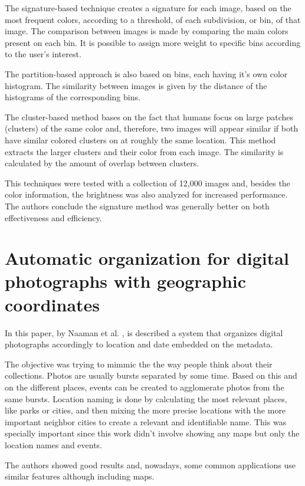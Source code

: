 The signature-based technique creates a signature for each image, based on the most frequent colors, according to a threshold, of each subdivision, or bin, of that image. The comparison between images is made by comparing the main colors present on each bin. It is possible to assign more weight to specific bins according to the user's interest.

The partition-based approach is also based on bins, each having it's own color histogram. The similarity between images is given by the distance of the histograms of the corresponding bins.

The cluster-based method bases on the fact that humans focus on large patches (clusters) of the same color and, therefore, two images will appear similar if both have similar colored clusters on at roughly the same location. This method extracts the larger clusters and their color from each image. The similarity is calculated by the amount of overlap between clusters.

This techniques were tested with a collection of 12,000 images and, besides the color information, the brightness was also analyzed for increased performance. The authors conclude the signature method was generally better on both effectiveness and efficiency.


\section{Automatic organization for digital photographs with geographic coordinates} %
\label{sub:Naaman}

In this paper, by Naaman et al. \cite{Naaman:2004p1802}, is described a system that organizes digital photographs accordingly to location and date embedded on the metadata.

The objective was trying to mimmic the the way people think about their collections. Photos are usually bursts separated by some time. Based on this and on the different places, events can be created to agglomerate photos from the same bursts. Location naming is done by calculating the most relevant places, like parks or cities, and then mixing the more precise locations with the more important neighbor cities to create a relevant and identifiable name. This was specially important since this work didn't involve showing any maps but only the location names and events.

The authors showed good results and, nowadays, some common applications use similar features although including maps.

